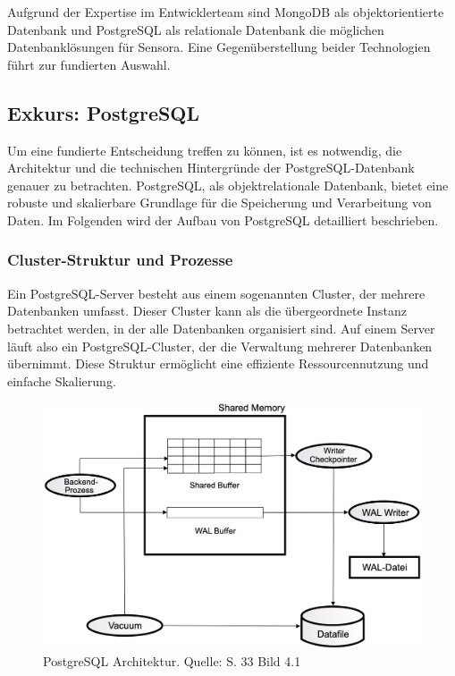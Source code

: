 Aufgrund der Expertise im Entwicklerteam sind MongoDB als objektorientierte Datenbank und PostgreSQL als relationale Datenbank die möglichen Datenbanklösungen für Sensora. Eine Gegenüberstellung beider Technologien führt zur fundierten Auswahl.

\subsection{Exkurs: PostgreSQL}
Um eine fundierte Entscheidung treffen zu können, ist es notwendig, die Architektur und die technischen Hintergründe der PostgreSQL-Datenbank genauer zu betrachten. PostgreSQL, als objektrelationale Datenbank, bietet eine robuste und skalierbare Grundlage für die Speicherung und Verarbeitung von Daten. Im Folgenden wird der Aufbau von PostgreSQL detailliert beschrieben.

\subsubsection{Cluster-Struktur und Prozesse}
Ein PostgreSQL-Server besteht aus einem sogenannten Cluster, der mehrere Datenbanken umfasst. Dieser Cluster kann als die übergeordnete Instanz betrachtet werden, in der alle Datenbanken organisiert sind. Auf einem Server läuft also ein PostgreSQL-Cluster, der die Verwaltung mehrerer Datenbanken übernimmt. Diese Struktur ermöglicht eine effiziente Ressourcennutzung und einfache Skalierung.

\begin{figure}[h]
\centering
\includegraphics[width=\textwidth]{img/PostgreSQL Aufbau.png}
\caption{PostgreSQL Architektur. Quelle: \cite{Froehlich2022} S. 33 Bild 4.1}
\label{fig:Architektur}
\end{figure}

